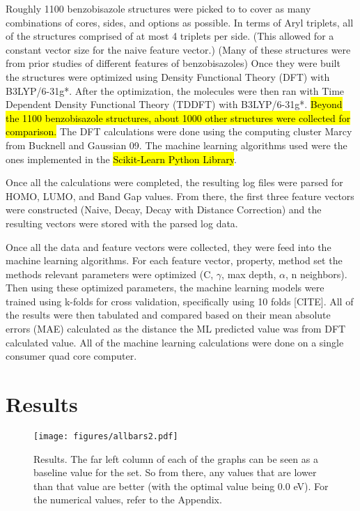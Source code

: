 \documentclass[10pt]{article}
\begin{document}
Roughly 1100 benzobisazole structures were picked to to cover as many combinations of cores, sides, and options as possible. In terms of Aryl triplets, all of the structures comprised of at most 4 triplets per side. (This allowed for a constant vector size for the naive feature vector.) (Many of these structures were from prior studies of different features of benzobisazoles) Once they were built the structures were optimized using Density Functional Theory (DFT) with B3LYP/6-31g*. After the optimization, the molecules were then ran with Time Dependent Density Functional Theory (TDDFT) with B3LYP/6-31g*. \hl{Beyond the 1100 benzobisazole structures, about 1000 other structures were collected for comparison.} The DFT calculations were done using the computing cluster Marcy from Bucknell and Gaussian 09. The machine learning algorithms used were the ones implemented in the \hl{Scikit-Learn Python Library}.

Once all the calculations were completed, the resulting log files were parsed for HOMO, LUMO, and Band Gap values. From there, the first three feature vectors were constructed (Naive, Decay, Decay with Distance Correction) and the resulting vectors were stored with the parsed log data.

Once all the data and feature vectors were collected, they were feed into the machine learning algorithms. For each feature vector, property, method set the methods relevant parameters were optimized (C, $\gamma$, max depth, $\alpha$, n neighbors). Then using these optimized parameters, the machine learning models were trained using k-folds for cross validation, specifically using 10 folds [CITE]. All of the results were then tabulated and compared based on their mean absolute errors (MAE) calculated as the distance the ML predicted value was from DFT calculated value. All of the machine learning calculations were done on a single consumer quad core computer.

\section{Results}

 \begin{figure}[H]
   \begin{center}
     \texttt{[image: figures/allbars2.pdf]}
   \end{center}
   \caption{Results. The far left column of each of the graphs can be seen as a baseline value for the set. So from there, any values that are lower than that value are better (with the optimal value being 0.0 eV). For the numerical values, refer to the Appendix.}
   \label{fig:results}
 \end{figure}
\end{document}
